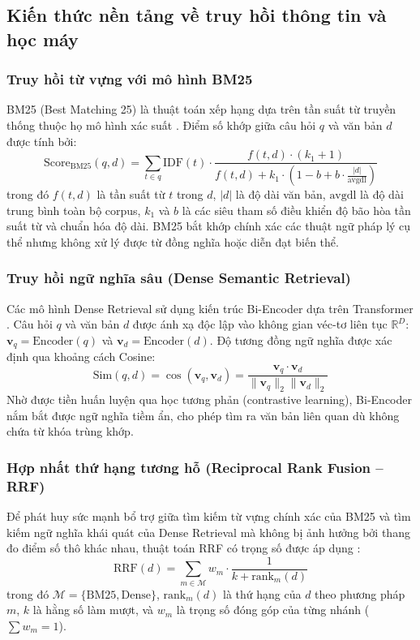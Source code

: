 \documentclass[12pt,a4paper]{article}
\begin{document}
\subsection{Kiến thức nền tảng về truy hồi thông tin và học máy}

\subsubsection{Truy hồi từ vựng với mô hình BM25}
BM25 (Best Matching 25) là thuật toán xếp hạng dựa trên tần suất từ truyền thống thuộc họ mô hình xác suất \cite{robertson2009probabilistic}. Điểm số khớp giữa câu hỏi $q$ và văn bản $d$ được tính bởi:
\begin{equation}
\text{Score}_{\text{BM25}}(q, d) = \sum_{t \in q} \text{IDF}(t) \cdot \frac{f(t, d) \cdot (k_1 + 1)}{f(t, d) + k_1 \cdot \left(1 - b + b \cdot \frac{|d|}{\text{avgdl}}\right)}
\label{eq:bm25}
\end{equation}
trong đó $f(t, d)$ là tần suất từ $t$ trong $d$, $|d|$ là độ dài văn bản, $\text{avgdl}$ là độ dài trung bình toàn bộ corpus, $k_1$ và $b$ là các siêu tham số điều khiển độ bão hòa tần suất từ và chuẩn hóa độ dài. BM25 bắt khớp chính xác các thuật ngữ pháp lý cụ thể nhưng không xử lý được từ đồng nghĩa hoặc diễn đạt biến thể.

\subsubsection{Truy hồi ngữ nghĩa sâu (Dense Semantic Retrieval)}
Các mô hình Dense Retrieval sử dụng kiến trúc Bi-Encoder dựa trên Transformer \cite{karpukhin2020dense, wang2022text}. Câu hỏi $q$ và văn bản $d$ được ánh xạ độc lập vào không gian véc-tơ liên tục $\mathbb{R}^D$: $\mathbf{v}_q = \text{Encoder}(q)$ và $\mathbf{v}_d = \text{Encoder}(d)$. Độ tương đồng ngữ nghĩa được xác định qua khoảng cách Cosine:
\begin{equation}
\text{Sim}(q, d) = \cos(\mathbf{v}_q, \mathbf{v}_d) = \frac{\mathbf{v}_q \cdot \mathbf{v}_d}{\|\mathbf{v}_q\|_2 \|\mathbf{v}_d\|_2}
\label{eq:cosine}
\end{equation}
Nhờ được tiền huấn luyện qua học tương phản (contrastive learning), Bi-Encoder nắm bắt được ngữ nghĩa tiềm ẩn, cho phép tìm ra văn bản liên quan dù không chứa từ khóa trùng khớp.

\subsubsection{Hợp nhất thứ hạng tương hỗ (Reciprocal Rank Fusion -- RRF)}
Để phát huy sức mạnh bổ trợ giữa tìm kiếm từ vựng chính xác của BM25 và tìm kiếm ngữ nghĩa khái quát của Dense Retrieval mà không bị ảnh hưởng bởi thang đo điểm số thô khác nhau, thuật toán RRF có trọng số được áp dụng \cite{cormack2009reciprocal}:
\begin{equation}
\text{RRF}(d) = \sum_{m \in \mathcal{M}} w_m \cdot \frac{1}{k + \text{rank}_m(d)}
\label{eq:rrf_theory}
\end{equation}
trong đó $\mathcal{M} = \{\text{BM25}, \text{Dense}\}$, $\text{rank}_m(d)$ là thứ hạng của $d$ theo phương pháp $m$, $k$ là hằng số làm mượt, và $w_m$ là trọng số đóng góp của từng nhánh ($\sum w_m = 1$).
\end{document}
